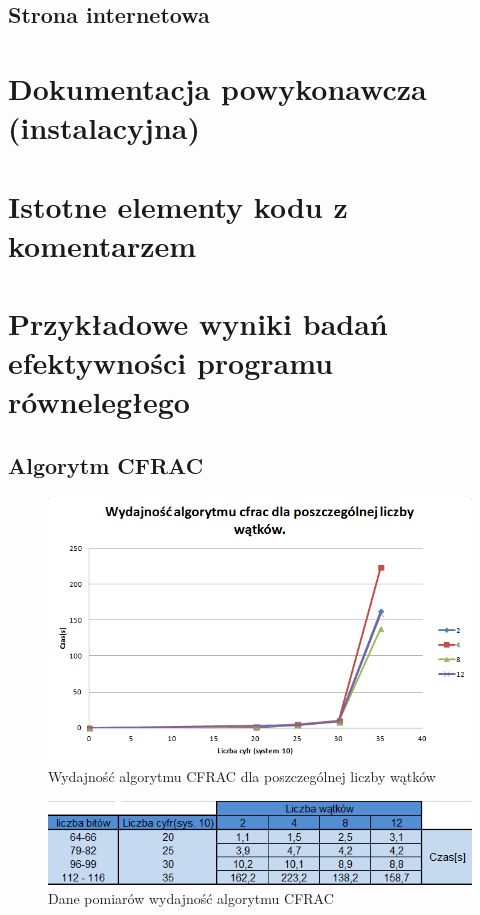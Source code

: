 \documentclass{article}
\begin{document}
\subsection{Strona internetowa}

\section{Dokumentacja powykonawcza (instalacyjna)}

\section{Istotne elementy kodu z komentarzem}

\newpage
\section{Przykładowe wyniki badań efektywności programu równeległego}
\subsection{Algorytm CFRAC}
\begin{figure}[h]
    \centering
    \includegraphics[width=1.0\textwidth]{cfracWydajnosc.png}
    \caption{Wydajność algorytmu CFRAC dla poszczególnej liczby wątków}
    \label{fig:cfracWykres}
\end{figure}
\begin{figure}[h]
    \centering
    \includegraphics[width=1.0\textwidth]{cfracWydajnoscTabela.png}
    \caption{Dane pomiarów wydajność algorytmu CFRAC}
    \label{fig:cfracTabela}
\end{figure}
\end{document}
